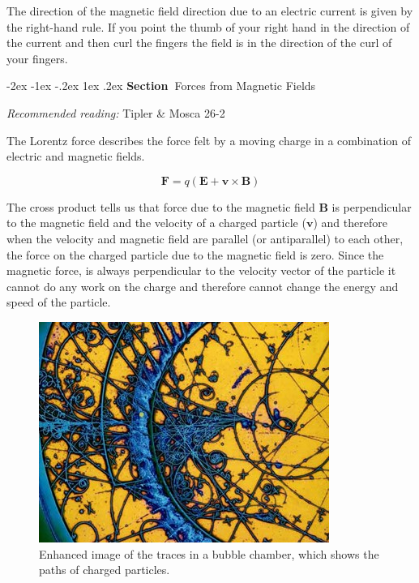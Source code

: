 \documentclass[
]{book}
\makeatletter
\renewcommand\section{%
\@startsection{section}{1}{\z@}%
              {-2ex \@plus -1ex \@minus -.2ex}%
              {1ex \@plus .2ex}%
              {\sffamily\bfseries\large\noindent Section~}}
\numberwithin{equation}{section}
\makeatother
\begin{document}
The direction of the magnetic field direction due to an electric current
is given by the right-hand rule. If you point the thumb of your right
hand in the direction of the current and then curl the fingers the field
is in the direction of the curl of your fingers.

\hypertarget{forces-from-magnetic-fields}{%
\section{Forces from Magnetic Fields}\label{forces-from-magnetic-fields}}

\emph{Recommended reading:} Tipler \& Mosca 26-2

The Lorentz force describes the force felt by a moving charge in a
combination of electric and magnetic fields.

\begin{equation}
\label{eq:qvCrossB}
\mathbf{F} = q(\mathbf{E} + \mathbf{v} \times \mathbf{B})
\end{equation}

The cross product tells us that force due to the magnetic field \(\mathbf{B}\) is
perpendicular to the magnetic field and the velocity of a charged
particle (\(\mathbf{v}\)) and therefore when the velocity and magnetic field are
parallel (or antiparallel) to each other, the force on the charged
particle due to the magnetic field is zero. Since the magnetic force, is
always perpendicular to the velocity vector of the particle it cannot do
any work on the charge and therefore cannot change the energy and speed
of the particle.

\begin{figure}

{\centering \includegraphics[width=0.7\linewidth]{Figures/bubble_chamber} 

}

\caption{Enhanced image of the traces in a bubble chamber, which shows the paths of charged particles.}\label{fig:bubbleChamber}
\end{figure}
\end{document}
